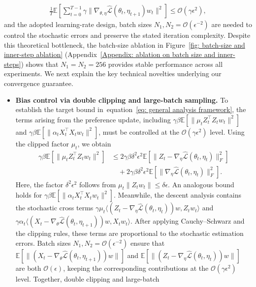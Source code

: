 \documentclass[twoside]{article} %
\def\eqref#1{equation~\ref{#1}}
\theoremstyle{plain}
\theoremstyle{definition}
\theoremstyle{remark}
\newcommand{\fhL}{\hat{\mathcal{L}}}
\begin{document}
\begin{align}
    \frac{1}{T}\mathbb{E}[\sum_{t=0}^{T-1}\gamma\|\nabla_{\theta,\eta}\fhL(\theta_t,\eta_{t+1})w_t\|^2]\leq\mathcal{O}(\gamma\epsilon^2),
    \label{eq: general analysis framework}
\end{align}
and the adopted learning-rate design, batch sizes \(N_1,N_2=\mathcal{O}(\epsilon^{-2})\) are needed to control the stochastic errors and preserve the stated iteration complexity. Despite this theoretical bottleneck, the batch-size ablation in Figure~\ref{fig: batch-size and inner-step ablation} (Appendix~\ref{Appendix: ablation on batch size and inner-steps}) shows that \(N_1=N_2=256\) provides stable performance across all experiments. We next explain the key technical novelties underlying our convergence guarantee.
\begin{itemize}[leftmargin = *, topsep = 0pt] 
\item \textbf{Bias control via double clipping and large-batch sampling.} To establish the target bound in~\eqref{eq: general analysis framework}, the
terms arising from the preference update, including
$\gamma\beta\mathbb{E}[\|\mu_tZ_t^\top Z_tw_t\|^2]$ and
$\gamma\beta\mathbb{E}[\|\alpha_tX_t^\top X_tw_t\|^2]$, must be controlled at
the $\mathcal{O}(\gamma\epsilon^2)$ level. Using the clipped factor $\mu_t$, we obtain
\begin{align}
\gamma\beta\mathbb{E}[\|\mu_tZ_t^\top Z_tw_t\|^2]
&\leq
2\gamma\beta\delta^2\epsilon^2
\mathbb{E}[\|Z_t-\nabla_{\eta}\fhL(\theta_t,\eta_t)\|_F^2]\nonumber\\
&\quad+
2\gamma\beta\delta^2\epsilon^2
\mathbb{E}[\|\nabla_{\eta}\fhL(\theta_t,\eta_t)\|_F^2].\nonumber
\end{align}
Here, the factor $\delta^2\epsilon^2$ follows from
$\mu_t\|Z_tw_t\|\leq\delta\epsilon$. An analogous bound holds for
$\gamma\beta\mathbb{E}[\|\alpha_tX_t^\top X_tw_t\|^2]$. Meanwhile, the descent
analysis contains the stochastic cross terms
$\gamma\mu_t\langle(Z_t-\nabla_{\eta}\fhL(\theta_t,\eta_t))w,Z_tw_t\rangle$
and
$\gamma\alpha_t\langle(X_t-\nabla_{\theta}\fhL(\theta_t,\eta_{t+1}))w,
X_tw_t\rangle$. After applying Cauchy--Schwarz and the clipping rules, these
terms are proportional to the stochastic estimation errors. Batch sizes
$N_1,N_2=\mathcal{O}(\epsilon^{-2})$ ensure that
$\mathbb{E}[\|(X_t-\nabla_{\theta}\fhL(\theta_t,\eta_{t+1}))w\|]$ and
$\mathbb{E}[\|(Z_t-\nabla_{\eta}\fhL(\theta_t,\eta_t))w\|]$ are both
$\mathcal{O}(\epsilon)$, keeping the corresponding contributions at the
$\mathcal{O}(\gamma\epsilon^2)$ level. Together, double clipping and large-batch

\end{itemize}
\end{document}
